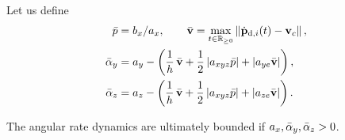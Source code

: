 \begin{theorem}\label{theorem:angular_velocities}
        Let us define
        \begin{subequations}
            \begin{align}
                \Bar{p} &= b_x / a_x, \qquad
                \Bar{\mathbf{v}} = \max_{t \in \mathbb{R}_{\geq 0}}\left\|\dot{\mathbf{p}}_{{\rm d},i}(t) - \mathbf{v}_c\right\|, \\
                \Bar{\alpha}_y &= a_y - \left(\frac{1}{h}\,\Bar{\mathbf{v}} + \frac{1}{2}\left|a_{xyz}\Bar{p}\right| + \left|a_{ye}\Bar{\mathbf{v}}\right|\right), \\
                \Bar{\alpha}_z &= a_z - \left(\frac{1}{h}\,\Bar{\mathbf{v}} + \frac{1}{2}\left|a_{xyz}\Bar{p}\right| + \left|a_{ze}\Bar{\mathbf{v}}\right|\right).
            \end{align} \label{eq:a_bounds}
        \end{subequations}

        \noindent The angular rate dynamics are ultimately bounded if $a_x, \Bar{\alpha}_y, \Bar{\alpha}_z > 0$.
\end{theorem}

